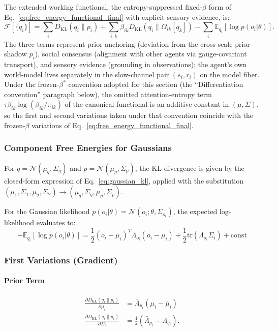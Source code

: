 \documentclass[11pt]{article}
\begin{document}
The extended working functional, the entropy-suppressed fixed-$\beta$ form of Eq.~\eqref{eq:free_energy_functional_final} with explicit sensory evidence, is:
\begin{equation}
\mathcal{F}[\{q_i\}] = \sum_i D_{\mathrm{KL}}(q_i \| p_i) + \sum_{i,k} \beta_{ik} D_{\mathrm{KL}}(q_i \| \Omega_{ik}[q_k]) - \sum_i \mathbb{E}_{q_i}[\log p(o_i | \theta)].
\label{eq:extended_free_energy}
\end{equation}
The three terms represent prior anchoring (deviation from the cross-scale prior shadow $p_i$), social consensus (alignment with other agents via gauge-covariant transport), and sensory evidence (grounding in observations); the agent's own world-model lives separately in the slow-channel pair $(s_i, r_i)$ on the model fiber. Under the frozen-$\beta^*$ convention adopted for this section (the ``Differentiation convention'' paragraph below), the omitted attention-entropy term $\tau\beta_{ik}\log(\beta_{ik}/\pi_{ik})$ of the canonical functional is an additive constant in $(\mu, \Sigma)$, so the first and second variations taken under that convention coincide with the frozen-$\beta$ variations of Eq.~\eqref{eq:free_energy_functional_final}.

\subsubsection{Component Free Energies for Gaussians}

For $q = \mathcal{N}(\mu_q, \Sigma_q)$ and $p = \mathcal{N}(\mu_p, \Sigma_p)$, the KL divergence is given by the closed-form expression of Eq.~\eqref{eq:gaussian_kl}, applied with the substitution $(\mu_1, \Sigma_1, \mu_2, \Sigma_2) \to (\mu_q, \Sigma_q, \mu_p, \Sigma_p)$.

For the Gaussian likelihood $p(o_i | \theta) = \mathcal{N}(o_i; \theta, \Sigma_{o_i})$, the expected log-likelihood evaluates to:
\begin{equation}
-\mathbb{E}_{q_i}[\log p(o_i | \theta)] = \frac{1}{2}(o_i - \mu_i)^T \Lambda_{o_i}(o_i - \mu_i) + \frac{1}{2}\mathrm{tr}(\Lambda_{o_i}\Sigma_i) + \mathrm{const}
\end{equation}

\subsubsection{First Variations (Gradient)}

\paragraph{Prior Term}
\begin{align}
\frac{\partial D_{\mathrm{KL}}(q_i \| p_i)}{\partial \mu_i} &= \bar{\Lambda}_{p_i}(\mu_i - \bar{\mu}_i) \\
\frac{\partial D_{\mathrm{KL}}(q_i \| p_i)}{\partial \Sigma_i} &= \frac{1}{2}(\bar{\Lambda}_{p_i} - \Lambda_{q_i}).
\end{align}
\end{document}
